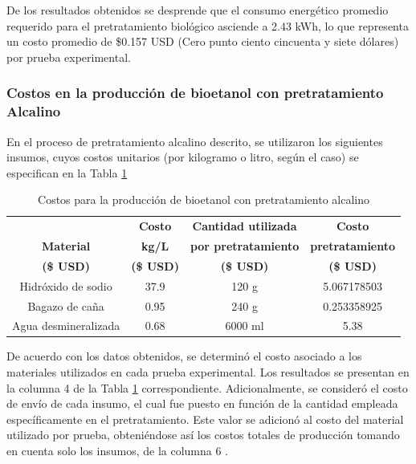 \documentclass[12pt]{article}
\begin{document}
	
De los resultados obtenidos se desprende que el consumo energético promedio requerido para el pretratamiento biológico asciende a 2.43 kWh, lo que representa un costo promedio de \$0.157 USD (Cero punto ciento cincuenta y siete dólares) por prueba experimental.

	
		\subsubsection{Costos en la producción de bioetanol con pretratamiento Alcalino }
	
	En el proceso de pretratamiento alcalino descrito, se utilizaron los siguientes insumos, cuyos costos unitarios (por kilogramo o litro, según el caso) se especifican en la Tabla \ref{Costo para pretratamiento alcalino}
	
	
	
	\begin{table}[H]
		\centering
		\caption{Costos para la producción de bioetanol con pretratamiento alcalino}
		\label{Costo para pretratamiento alcalino}
		\setlength{\tabcolsep}{2.5pt}
		\begin{tabular}{|c|c|c|c|}
			\hline
			& \textbf{Costo}& \textbf{Cantidad utilizada }  & \textbf{ Costo} \\
			\textbf{Material}&	\textbf{kg/L} & 	\textbf{por pretratamiento}& \textbf{pretratamiento} \\ 
			\textbf{(\$ USD) }		& \textbf{(\$ USD)} &\textbf{	(\$ USD) }& \textbf{	(\$ USD) }\\ \hline		
			Hidróxido de sodio&37.9& 120 g&5.067178503 \\ \hline
			Bagazo de caña 	  &0.95& 240 g &  0.253358925 \\ \hline
			Agua desmineralizada&0.68& 6000 ml  & 5.38 \\ \hline
		\end{tabular} 
		
		
	\end{table}
	De acuerdo con los datos obtenidos, se determinó el costo asociado a los materiales utilizados en cada prueba experimental. Los resultados se presentan en la columna 4 de la Tabla \ref{Costo para pretratamiento alcalino} correspondiente. Adicionalmente, se consideró el costo de envío de cada insumo, el cual fue puesto en función de la cantidad empleada específicamente en el pretratamiento. Este valor se adicionó al costo del material utilizado por prueba, obteniéndose así los costos totales de producción tomando en cuenta solo los insumos, de la columna 6 .
\end{document}
